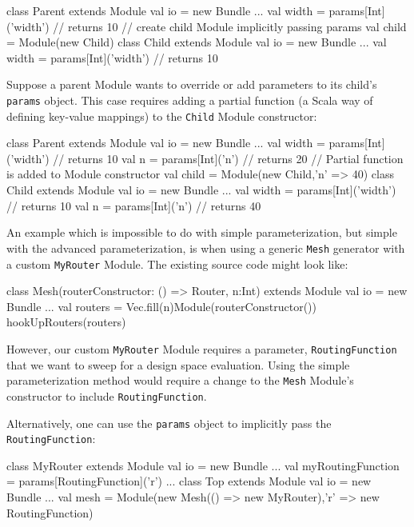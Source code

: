 \begin{scala}
class Parent extends Module {
  val io = new Bundle { ... }
  val width = params[Int]('width') // returns 10
  // create child Module implicitly passing params
  val child = Module(new Child) 
}
class Child extends Module {
  val io = new Bundle { ... }
  val width = params[Int]('width') // returns 10
}
\end{scala}

Suppose a parent Module wants to override or add parameters to its child's \verb+params+ object. This case requires adding a partial function (a Scala way of defining key-value mappings) to the \verb+Child+ Module constructor:

\begin{scala}
class Parent extends Module {
  val io = new Bundle { ... }
  val width = params[Int]('width') // returns 10
  val n = params[Int]('n') // returns 20
  // Partial function is added to Module constructor
  val child = Module(new Child,{'n' => 40})
}
class Child extends Module {
  val io = new Bundle { ... }
  val width = params[Int]('width') // returns 10
  val n = params[Int]('n') // returns 40
}
\end{scala}

An example which is impossible to do with simple parameterization, but simple with the advanced parameterization, is when using a generic \verb+Mesh+ generator with a custom \verb+MyRouter+ Module. The existing source code might look like:

\begin{scala}
class Mesh(routerConstructor: () => Router, n:Int) extends Module {
  val io = new Bundle { ... }
  val routers = Vec.fill(n){Module(routerConstructor())}
  hookUpRouters(routers)
}
\end{scala}

However, our custom \verb+MyRouter+ Module requires a parameter, \verb+RoutingFunction+ that we want to sweep for a design space evaluation. Using the simple parameterization method would require a change to the \verb+Mesh+ Module's constructor to include \verb+RoutingFunction+. 

Alternatively, one can use the \verb+params+ object to implicitly pass the \verb+RoutingFunction+:

\begin{scala}
class MyRouter extends Module {
  val io = new Bundle { ... }
  val myRoutingFunction = params[RoutingFunction]('r')
  ...
}
class Top extends Module {
  val io = new Bundle { ... }
  val mesh = Module(new Mesh(() => new MyRouter),{'r' => new RoutingFunction})
}
\end{scala}

